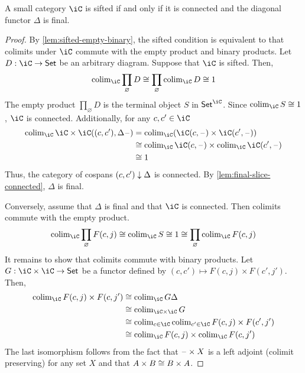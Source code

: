 \documentclass{zett}
\begin{document}
\begin{thm}\label{thm:characterization-of-sifted}
  A small category $\iC$ is sifted if and only if it is connected and the diagonal functor $\Delta$ is final.
\end{thm}
\begin{proof}
  By \cref{lem:sifted-empty-binary}, the sifted condition is equivalent to that colimits under $\iC$ commute with the empty product and binary products.
  Let $D : \iC \to \CSet$ be an arbitrary diagram.
  Suppose that $\iC$ is sifted.
  Then,
  \[
    \colim_{\iC}\prod_{\varnothing}D \iso \prod_{\varnothing}\colim_{\iC}D \iso 1
  \]
  The empty product $\prod_{\varnothing}D$ is the terminal object $S$ in $\CSet^{\iC}$.
  Since $\colim_{\iC}S \iso 1$, $\iC$ is connected.
  Additionally, for any $c, c' \in \iC$
  \begin{align}
    \colim_{\iC}\iC \times \iC((c, c'), \Delta\blank) &= \colim_{\iC}(\iC(c, \blank) \times \iC(c', \blank))\\
                                            &\iso \colim_{\iC}\iC(c, \blank) \times \colim_{\iC}\iC(c', \blank)\\
                                            &\iso 1
  \end{align}
  Thus, the category of cospans $(c, c') \downarrow \Delta$ is connected.
  By \cref{lem:final-slice-connected}, $\Delta$ is final.
  
  Conversely, assume that $\Delta$ is final and that $\iC$ is connected.
  Then colimits commute with the empty product. 
  \[
    \colim_{\iC}\prod_{\varnothing}F(c,j) \iso \colim_{\iC}S \iso 1 \iso \prod_{\varnothing}\colim_{\iC}F(c,j)
  \]
  It remains to show that colimits commute with binary products.
  Let $G : \iC \times \iC \to \CSet$ be a functor defined by $(c, c') \mapsto F(c,j) \times F(c', j')$.
  Then,
  \begin{align}
    \colim_{\iC}F(c, j) \times F(c, j') &\iso \colim_{\iC}G\Delta\\
                                   &\iso \colim_{\iC \times \iC}G\\
                                   &\iso \colim_{c \in \iC}\colim_{c' \in \iC}F(c,j) \times F(c',j')\\
                                   &\iso \colim_{\iC}F(c, j) \times \colim_{\iC}F(c, j')
  \end{align}
  The last isomorphism follows from the fact that $\mathord{\hspace{1pt}\text{--}\hspace{1pt}} \times X$ is a left adjoint (colimit preserving) for any set $X$ and that $A \times B \cong B \times A$.
\end{proof}
\end{document}
